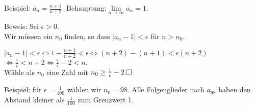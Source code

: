 \documentclass[11pt]{beamer}
\begin{document}
\begin{frame}[fragile]
Beispiel: $a_n = \frac{n+1}{n+2}$. \quad Behauptung:$\lim \limits_{n \to \infty} a_n = 1$. 

Beweis: Sei $\epsilon > 0$. \\
Wir müssen ein $n_0$ finden, so dass $ \vert a_n - 1 \vert < \epsilon$ für $n > n_0$.

$ \vert a_n - 1  \vert < \epsilon \Leftrightarrow 1 - \frac{n+1}{n+2} < \epsilon \Leftrightarrow (n+2)-(n+1) < \epsilon (n+2)$
$ \Leftrightarrow \frac{1}{\epsilon} < n+2 \Leftrightarrow \frac{1}{\epsilon} - 2 < n .$ \\
Wähle als $n_0$ eine Zahl mit $n_0 \ge \frac{1}{\epsilon} - 2. \hfill \square$


Beispiel: für $\epsilon = \frac{1}{100}$ wählen wir $n_0 = 98$. Alle Folgenglieder nach $a_{98}$ haben den Abstand kleiner als $\frac{1}{100}$ zum Grenzwert 1.

\end{frame}
\end{document}
